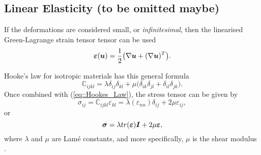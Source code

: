 \subsection{Linear Elasticity (to be omitted maybe)}
If the deformations are considered small, or \textit{infinitesimal}, then the linearised Green-Lagrange strain tensor tensor can be used
\begin{equation}
  \bm{\varepsilon}(\bm{u}) = \frac{1}{2}\big(\nabla\bm{u} + (\nabla\bm{u})^T\big).
\end{equation}

Hooke's law for isotropic materials has this general formula
\begin{equation}
  \mathbb{C}_{ijkl} = \lambda\delta_{ij}\delta_{kl} + \mu\big(\delta_{ik}\delta_{jl} + \delta_{il}\delta_{jk}\big).
\end{equation}
Once combined with (\ref{eq::Hookes_Law}), the stress tensor can be given by
\begin{equation}
  \sigma_{ij} = \mathbb{C}_{ijkl}\varepsilon_{kl} = \lambda(\varepsilon_{nn})\delta_{ij} + 2\mu\varepsilon_{ij},
\end{equation}
or
\begin{equation}
  \bm{\sigma} = \lambda tr(\bm{\varepsilon})\bm{I} + 2\mu\bm{\varepsilon},
\end{equation}
where $\lambda$ and $\mu$ are Lam\'{e} constants, and more specifically, $\mu$ is the shear modulus \cite{landau86}.
